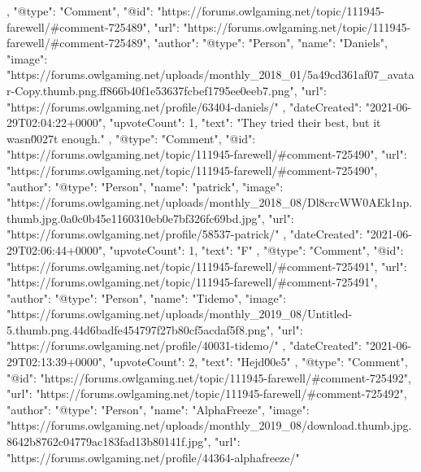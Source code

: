 {{        },
        {
            "@type": "Comment",
            "@id": "https://forums.owlgaming.net/topic/111945-farewell/#comment-725489",
            "url": "https://forums.owlgaming.net/topic/111945-farewell/#comment-725489",
            "author": {
                "@type": "Person",
                "name": "Daniels",
                "image": "https://forums.owlgaming.net/uploads/monthly_2018_01/5a49cd361af07_avatar-Copy.thumb.png.ff866b40f1e53637fcbef1795ee0eeb7.png",
                "url": "https://forums.owlgaming.net/profile/63404-daniels/"
            },
            "dateCreated": "2021-06-29T02:04:22+0000",
            "upvoteCount": 1,
            "text": "They tried their best, but it wasn\u0027t enough.\n \n"
        },
        {
            "@type": "Comment",
            "@id": "https://forums.owlgaming.net/topic/111945-farewell/#comment-725490",
            "url": "https://forums.owlgaming.net/topic/111945-farewell/#comment-725490",
            "author": {
                "@type": "Person",
                "name": "patrick",
                "image": "https://forums.owlgaming.net/uploads/monthly_2018_08/Dl8crcWW0AEk1np.thumb.jpg.0a0c0b45e1160310eb0e7bf326fc69bd.jpg",
                "url": "https://forums.owlgaming.net/profile/58537-patrick/"
            },
            "dateCreated": "2021-06-29T02:06:44+0000",
            "upvoteCount": 1,
            "text": "F\n \n"
        },
        {
            "@type": "Comment",
            "@id": "https://forums.owlgaming.net/topic/111945-farewell/#comment-725491",
            "url": "https://forums.owlgaming.net/topic/111945-farewell/#comment-725491",
            "author": {
                "@type": "Person",
                "name": "Tidemo",
                "image": "https://forums.owlgaming.net/uploads/monthly_2019_08/Untitled-5.thumb.png.44d6badfe454797f27b80cf5acdaf5f8.png",
                "url": "https://forums.owlgaming.net/profile/40031-tidemo/"
            },
            "dateCreated": "2021-06-29T02:13:39+0000",
            "upvoteCount": 2,
            "text": "Hejd\u00e5\n \n"
        },
        {
            "@type": "Comment",
            "@id": "https://forums.owlgaming.net/topic/111945-farewell/#comment-725492",
            "url": "https://forums.owlgaming.net/topic/111945-farewell/#comment-725492",
            "author": {
                "@type": "Person",
                "name": "AlphaFreeze",
                "image": "https://forums.owlgaming.net/uploads/monthly_2019_08/download.thumb.jpg.8642b8762c04779ac183fad13b80141f.jpg",
                "url": "https://forums.owlgaming.net/profile/44364-alphafreeze/"
}}}
